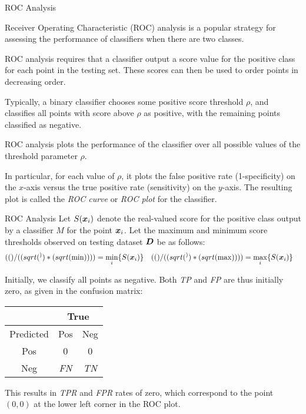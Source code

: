 \begin{frame}{ROC Analysis}

Receiver
Operating Characteristic (ROC) analysis is a popular strategy for
assessing the performance of classif\/{i}ers when there are two
classes. 

\medskip
ROC analysis requires that a classif\/{i}er output a score
value for the positive class for each point in the testing set.
These scores can then be used to order points in decreasing order.

\medskip
Typically, a binary classif\/{i}er
chooses some positive score threshold $\rho$, and
classif\/{i}es all points with score above $\rho$ as positive,
with the remaining points classif\/{i}ed as negative.

\medskip
ROC analysis plots the
performance of the classif\/{i}er over all possible values of the threshold
parameter $\rho$. 


\medskip
In particular, for each value of $\rho$, it
plots the false positive rate (1-specif\/{i}city) on the $x$-axis
versus the true positive
rate (sensitivity) on the $y$-axis.
The resulting plot is called the {\em ROC curve} or {\em ROC plot} for
the classif\/{i}er.
\end{frame}





\begin{frame}[fragile]{ROC Analysis}
Let $S({\boldsymbol x}_i)$ denote the real-valued score for the positive class
output by a classif\/{i}er $M$ for the point ${\boldsymbol x}_i$. Let the maximum
and minimum score thresholds observed on testing dataset ${\boldsymbol D}$ be
as follows:
\begin{align*}
\rho^{\min} & = \min_i \{ S(\bx_i) \} &
\rho^{\max} & = \max_i \{ S(\bx_i) \}
\end{align*}


Initially, we classify all points as negative. Both {\it TP} and {\it FP} are
thus initially zero, as given in the confusion matrix:
\begin{center}
\begin{tabular}{|c|c|c|}
  \hline
    & \multicolumn{2}{c|}{True}\\
  \hline
  Predicted & Pos & Neg\\
  \hline
  Pos& 0 & 0\\
  Neg& {\it FN} & {\it TN}\\
  \hline
  \end{tabular}
\end{center}
This results in {\it TPR} and {\it FPR}
rates of zero, which correspond to the point $(0,0)$ at the lower
left corner in the ROC plot. 
\end{frame}

